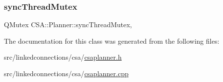 \subsubsection{\texorpdfstring{sync\+Thread\+Mutex}{syncThreadMutex}}
{\footnotesize\ttfamily Q\+Mutex C\+S\+A\+::\+Planner\+::sync\+Thread\+Mutex\hspace{0.3cm}{\ttfamily [mutable]}, {\ttfamily [private]}}



The documentation for this class was generated from the following files\+:\begin{DoxyCompactItemize}
\item 
src/linkedconnections/csa/\mbox{\hyperlink{csaplanner_8h}{csaplanner.\+h}}\item 
src/linkedconnections/csa/\mbox{\hyperlink{csaplanner_8cpp}{csaplanner.\+cpp}}\end{DoxyCompactItemize}
